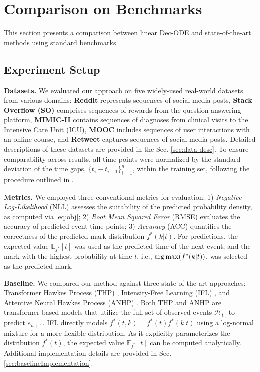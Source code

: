 
\section{Comparison on Benchmarks}
This section presents a comparison between linear Dec-ODE and state-of-the-art methods using standard benchmarks.

\subsection{Experiment Setup \label{sec:experimentSetup}}
\label{sec:setup}

\textbf{Datasets.}  
We evaluated our approach on five widely-used real-world datasets from various domains:  
{\bf Reddit} represents sequences of social media posts,  
{\bf Stack Overflow (SO)} comprises sequences of rewards from the question-answering platform,  
{\bf MIMIC-II} contains sequences of diagnoses from clinical visits to the Intensive Care Unit (ICU),  
{\bf MOOC} includes sequences of user interactions with an online course,  
and {\bf Retweet} captures sequences of social media posts. Detailed descriptions of these datasets are provided in the Sec. \ref{sec:data-desc}.  
To ensure comparability across results, all time points were normalized by the standard deviation of the time gaps, $\{t_i - t_{i-1}\}_{i=1}^n$, within the training set, following the procedure outlined in \cite{bib:MetaTPP}.  

\textbf{Metrics.}  
We employed three conventional metrics for evaluation:  
1) \textit{Negative Log-Likelihood} (NLL) assesses the suitability of the predicted probability density, as computed via \eqref{eq:obj};  
2) \textit{Root Mean Squared Error} (RMSE) evaluates the accuracy of predicted event time points;  
3) \textit{Accuracy} (ACC) quantifies the correctness of the predicted mark distribution $f^*(k|t)$.  
For predictions, the expected value $\mathbb{E}_{f^*}[t]$ was used as the predicted time of the next event, and the mark with the highest probability at time $t$, i.e., $\argmax(f^*(k|t))$, was selected as the predicted mark.  

\textbf{Baseline.}  
We compared our method against three state-of-the-art approaches:  
Transformer Hawkes Process (THP) \cite{bib:THP}, Intensity-Free Learning (IFL) \cite{bib:ifl}, and Attentive Neural Hawkes Process (ANHP) \cite{bib:ANHP}.  
Both THP and ANHP are transformer-based models that utilize the full set of observed events $\mathcal{H}_{t_n}$ to predict $e_{n+1}$.  
IFL directly models $f^*(t,k) = f^*(t) f^*(k|t)$ using a log-normal mixture for a more flexible distribution.  
As it explicitly parameterizes the distribution $f^*(t)$, the expected value $\mathbb{E}_{f^*}[t]$ can be computed analytically.  
Additional implementation details are provided in Sec.\ref{sec:baselineImplementation}.



